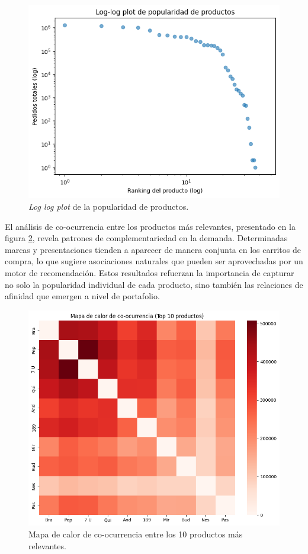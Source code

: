 \begin{figure}[htpb]
	\centering
	\includegraphics[scale=.65]{./Figures/log_log_plot.png}
	\caption{\textit{Log log plot} de la popularidad de productos.}
	\label{fig:log_log_plot}
\end{figure}

El análisis de co-ocurrencia entre los productos más relevantes, presentado en la figura \ref{fig:heatmap_coocurrencia}, revela patrones de complementariedad en la demanda. Determinadas marcas y presentaciones tienden a aparecer de manera conjunta en los carritos de compra, lo que sugiere asociaciones naturales que pueden ser aprovechadas por un motor de recomendación. Estos resultados refuerzan la importancia de capturar no solo la popularidad individual de cada producto, sino también las relaciones de afinidad que emergen a nivel de portafolio.

\begin{figure}[htpb]
	\centering
	\includegraphics[scale=.5]{./Figures/heatmap_coocurrencia.png}
	\caption{Mapa de calor de co-ocurrencia entre los 10 productos más relevantes.}
	\label{fig:heatmap_coocurrencia}
\end{figure}

